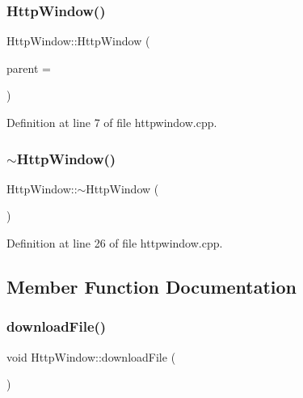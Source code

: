 \subsubsection{\texorpdfstring{Http\+Window()}{HttpWindow()}}
{\footnotesize\ttfamily Http\+Window\+::\+Http\+Window (\begin{DoxyParamCaption}\item[{Q\+Object $\ast$}]{parent = {} }\end{DoxyParamCaption})\hspace{0.3cm}{\ttfamily [explicit]}}



Definition at line 7 of file httpwindow.\+cpp.

\mbox{\label{classHttpWindow_ab8366665996f36800cef89d64cd08041}} 
\subsubsection{\texorpdfstring{$\sim$\+Http\+Window()}{~HttpWindow()}}
{\footnotesize\ttfamily Http\+Window\+::$\sim$\+Http\+Window (\begin{DoxyParamCaption}{ }\end{DoxyParamCaption})}



Definition at line 26 of file httpwindow.\+cpp.



\subsection{Member Function Documentation}
\mbox{\label{classHttpWindow_ab0f982da3e2d49cdf92cbb203819f153}} 
\subsubsection{\texorpdfstring{download\+File()}{downloadFile()}}
{\footnotesize\ttfamily void Http\+Window\+::download\+File (\begin{DoxyParamCaption}{ }\end{DoxyParamCaption})}



